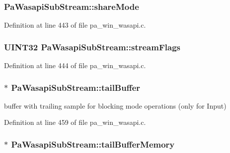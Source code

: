 \subsubsection[{\texorpdfstring{share\+Mode}{shareMode}}]{ Pa\+Wasapi\+Sub\+Stream\+::share\+Mode}\hypertarget{struct_pa_wasapi_sub_stream_ad4e1044e8ccb66d75465e791d2e34590}{}\label{struct_pa_wasapi_sub_stream_ad4e1044e8ccb66d75465e791d2e34590}


Definition at line 443 of file pa\+\_\+win\+\_\+wasapi.\+c.

\subsubsection[{\texorpdfstring{stream\+Flags}{streamFlags}}]{\setlength{\rightskip}{0pt plus 5cm}U\+I\+N\+T32 Pa\+Wasapi\+Sub\+Stream\+::stream\+Flags}\hypertarget{struct_pa_wasapi_sub_stream_aa321f145187ba40bc71f219db48c7edf}{}\label{struct_pa_wasapi_sub_stream_aa321f145187ba40bc71f219db48c7edf}


Definition at line 444 of file pa\+\_\+win\+\_\+wasapi.\+c.

\subsubsection[{\texorpdfstring{tail\+Buffer}{tailBuffer}}]{$\ast$ Pa\+Wasapi\+Sub\+Stream\+::tail\+Buffer}\hypertarget{struct_pa_wasapi_sub_stream_adf3195bb40b64f9415239817b7342793}{}\label{struct_pa_wasapi_sub_stream_adf3195bb40b64f9415239817b7342793}


buffer with trailing sample for blocking mode operations (only for Input) 



Definition at line 459 of file pa\+\_\+win\+\_\+wasapi.\+c.

\subsubsection[{\texorpdfstring{tail\+Buffer\+Memory}{tailBufferMemory}}]{$\ast$ Pa\+Wasapi\+Sub\+Stream\+::tail\+Buffer\+Memory}\hypertarget{struct_pa_wasapi_sub_stream_af13270a12d88b5a79a3f2929783a0611}{}\label{struct_pa_wasapi_sub_stream_af13270a12d88b5a79a3f2929783a0611}


